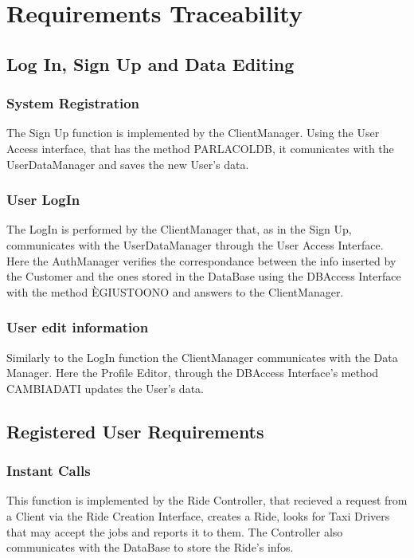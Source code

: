 \section{Requirements Traceability}
	\subsection {Log In, Sign Up and Data Editing}

		\subsubsection{System Registration}
		The Sign Up function is implemented by the ClientManager. Using the User Access interface, that has the method PARLACOLDB, it comunicates with the UserDataManager and saves the new User's data.
		
		\subsubsection{User LogIn}
		The LogIn is performed by the ClientManager that, as in the Sign Up, communicates with the UserDataManager through the User Access Interface. Here the AuthManager verifies the correspondance between the info inserted by the Customer and the ones stored in the DataBase using the DBAccess Interface with the method ÈGIUSTOONO and answers to the ClientManager.
		
		\subsubsection{User edit information}
		Similarly to the LogIn function the ClientManager communicates with the Data Manager. Here the Profile Editor, through the DBAccess Interface's method CAMBIADATI updates the User's data.
		
		\newpage
	\subsection {Registered User Requirements}
	
		
		\subsubsection{Instant Calls}
		This function is implemented by the Ride Controller, that recieved a request from a Client via the Ride Creation Interface, creates a Ride, looks for Taxi Drivers that may accept the jobs and reports it to them. The Controller also communicates with the DataBase to store the Ride's infos. \askpippo
		

